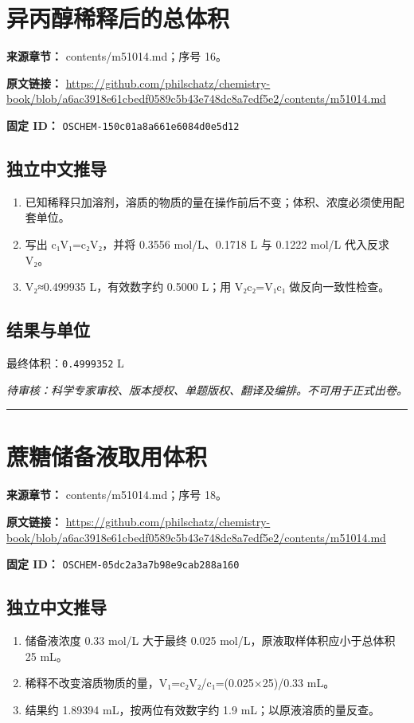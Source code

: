 \documentclass[UTF8,11pt,oneside,openany,fontset=none]{ctexbook}
\begin{document}
\section{异丙醇稀释后的总体积}
\noindent\textbf{来源章节：} contents/m51014.md；序号 16。\par
\noindent\textbf{原文链接：} \url{https://github.com/philschatz/chemistry-book/blob/a6ac3918e61cbedf0589c5b43e748dc8a7edf5e2/contents/m51014.md}\par
\noindent\textbf{固定 ID：} \texttt{OSCHEM-150c01a8a661e6084d0e5d12}\par
\subsection*{独立中文推导}
\begin{enumerate}
\item 已知稀释只加溶剂，溶质的物质的量在操作前后不变；体积、浓度必须使用配套单位。
\item 写出 c₁V₁=c₂V₂，并将 0.3556 mol/L、0.1718 L 与 0.1222 mol/L 代入反求 V₂。
\item V₂≈0.499935 L，有效数字约 0.5000 L；用 V₂c₂=V₁c₁ 做反向一致性检查。
\end{enumerate}
\subsection*{结果与单位}
\noindent 最终体积：\texttt{0.4999352} L\par
\noindent\textit{待审核：科学专家审校、版本授权、单题版权、翻译及编排。不可用于正式出卷。}
\medskip\hrule\medskip
\section{蔗糖储备液取用体积}
\noindent\textbf{来源章节：} contents/m51014.md；序号 18。\par
\noindent\textbf{原文链接：} \url{https://github.com/philschatz/chemistry-book/blob/a6ac3918e61cbedf0589c5b43e748dc8a7edf5e2/contents/m51014.md}\par
\noindent\textbf{固定 ID：} \texttt{OSCHEM-05dc2a3a7b98e9cab288a160}\par
\subsection*{独立中文推导}
\begin{enumerate}
\item 储备液浓度 0.33 mol/L 大于最终 0.025 mol/L，原液取样体积应小于总体积 25 mL。
\item 稀释不改变溶质物质的量，V₁=c₂V₂/c₁=(0.025×25)/0.33 mL。
\item 结果约 1.89394 mL，按两位有效数字约 1.9 mL；以原液溶质的量反查。
\end{enumerate}
\end{document}
